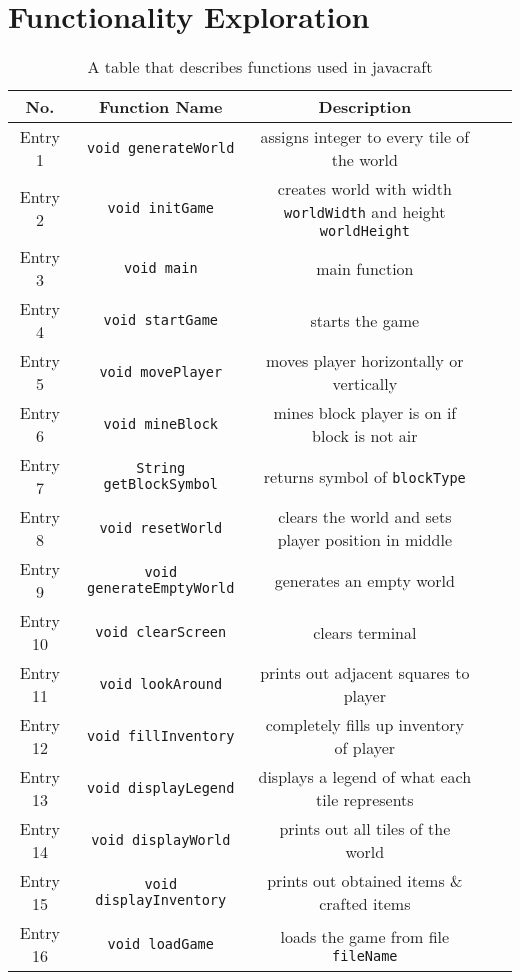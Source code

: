\section{Functionality Exploration} \label{section: functionality exploration}

\begin{table}[ht]
    \centering
    \caption{A table that describes functions used in javacraft}
    \begin{tabular}[t]{ccccc}
    \toprule
    \textbf{No.}&\textbf{Function Name}&\textbf{Description}\\
    \midrule
    Entry 1& \texttt{void generateWorld} & assigns integer to every tile of the world\\
    Entry 2& \texttt{void initGame} & creates world with width \texttt{worldWidth} and height \texttt{worldHeight}\\
    Entry 3& \texttt{void main} & main function\\
    Entry 4& \texttt{void startGame} & starts the game\\
    Entry 5& \texttt{void movePlayer} & moves player horizontally or vertically\\
    Entry 6& \texttt{void mineBlock} & mines block player is on if block is not air\\
    Entry 7& \texttt{String getBlockSymbol} & returns symbol of \texttt{blockType}\\
    Entry 8& \texttt{void resetWorld} & clears the world and sets player position in middle\\
    Entry 9& \texttt{void generateEmptyWorld} & generates an empty world\\
    Entry 10& \texttt{void clearScreen} & clears terminal\\
    Entry 11& \texttt{void lookAround} & prints out adjacent squares to player\\
    Entry 12& \texttt{void fillInventory} & completely fills up inventory of player\\
    Entry 13& \texttt{void displayLegend} & displays a legend of what each tile represents\\
    Entry 14& \texttt{void displayWorld} & prints out all tiles of the world\\
    Entry 15& \texttt{void displayInventory} & prints out obtained items \& crafted items\\
    Entry 16& \texttt{void loadGame} & loads the game from file \texttt{fileName}\\

\end{tabular}
\end{table}
